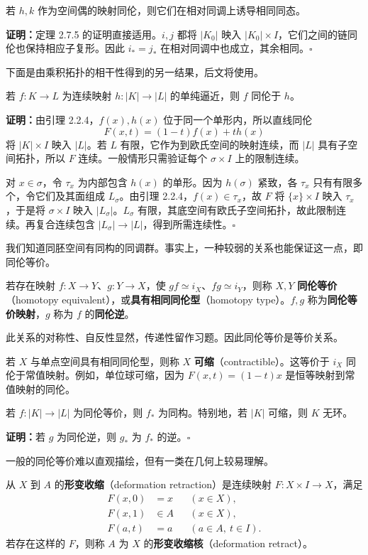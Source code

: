 若 $h,k$ 作为空间偶的映射同伦，则它们在相对同调上诱导相同同态。

\noindent\textbf{证明：}定理 2.7.5 的证明直接适用。$i,j$ 都将 $|K_0|$ 映入 $|K_0|\times I$，它们之间的链同伦也保持相应子复形。因此 $i_*=j_*$ 在相对同调中也成立，其余相同。\hfill$\square$

下面是由乘积拓扑的相干性得到的另一结果，后文将使用。

若 $f:K\to L$ 为连续映射 $h:|K|\to|L|$ 的单纯逼近，则 $f$ 同伦于 $h$。

\noindent\textbf{证明：}由引理 2.2.4，$f(x),h(x)$ 位于同一个单形内，所以直线同伦
\[
F(x,t)=(1-t)f(x)+th(x)
\]
将 $|K|\times I$ 映入 $|L|$。若 $L$ 有限，它作为到欧氏空间的映射连续，而 $|L|$ 具有子空间拓扑，所以 $F$ 连续。一般情形只需验证每个 $\sigma\times I$ 上的限制连续。

对 $x\in\sigma$，令 $\tau_x$ 为内部包含 $h(x)$ 的单形。因为 $h(\sigma)$ 紧致，各 $\tau_x$ 只有有限多个，令它们及其面组成 $L_\sigma$。由引理 2.2.4，$f(x)\in\tau_x$，故 $F$ 将 $\{x\}\times I$ 映入 $\tau_x$，于是将 $\sigma\times I$ 映入 $|L_\sigma|$。$L_\sigma$ 有限，其底空间有欧氏子空间拓扑，故此限制连续。再复合连续包含 $|L_\sigma|\to|L|$，得到所需连续性。\hfill$\square$

我们知道同胚空间有同构的同调群。事实上，一种较弱的关系也能保证这一点，即同伦等价。

若存在映射 $f:X\to Y$、$g:Y\to X$，使 $gf\simeq i_X$、$fg\simeq i_Y$，则称 $X,Y$ \textbf{同伦等价}（homotopy equivalent），或\textbf{具有相同同伦型}（homotopy type）。$f,g$ 称为\textbf{同伦等价映射}，$g$ 称为 $f$ 的\textbf{同伦逆}。

此关系的对称性、自反性显然，传递性留作习题。因此同伦等价是等价关系。

若 $X$ 与单点空间具有相同同伦型，则称 $X$ \textbf{可缩}（contractible）。这等价于 $i_X$ 同伦于常值映射。例如，单位球可缩，因为 $F(x,t)=(1-t)x$ 是恒等映射到常值映射的同伦。

若 $f:|K|\to|L|$ 为同伦等价，则 $f_*$ 为同构。特别地，若 $|K|$ 可缩，则 $K$ 无环。

\noindent\textbf{证明：}若 $g$ 为同伦逆，则 $g_*$ 为 $f_*$ 的逆。\hfill$\square$

一般的同伦等价难以直观描绘，但有一类在几何上较易理解。

从 $X$ 到 $A$ 的\textbf{形变收缩}（deformation retraction）是连续映射 $F:X\times I\to X$，满足
\[
\begin{aligned}
F(x,0)&=x&& (x\in X),\\
F(x,1)&\in A&& (x\in X),\\
F(a,t)&=a&& (a\in A,\ t\in I).
\end{aligned}
\]
若存在这样的 $F$，则称 $A$ 为 $X$ 的\textbf{形变收缩核}（deformation retract）。


